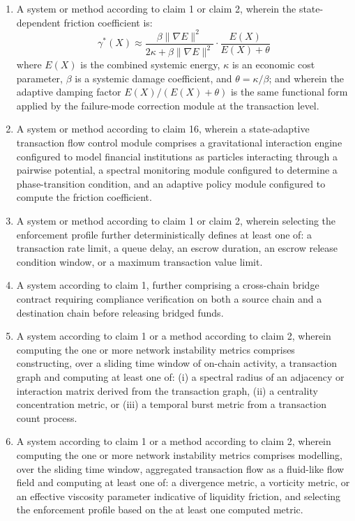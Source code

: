 \documentclass[12pt,a4paper]{article}
\begin{document}
\begin{enumerate}[label=\textbf{\arabic*.}]
\item A system or method according to claim 1 or claim 2, wherein the
state-dependent friction coefficient is:
\[
\gamma^*(X)\approx
\frac{\beta\|\nabla E\|^2}{2\kappa+\beta\|\nabla E\|^2}
\cdot\frac{E(X)}{E(X)+\theta}
\]
where $E(X)$ is the combined systemic energy, $\kappa$ is an economic
cost parameter, $\beta$ is a systemic damage coefficient, and
$\theta=\kappa/\beta$; and wherein the adaptive damping factor
$E(X)/(E(X)+\theta)$ is the same functional form applied by the
failure-mode correction module at the transaction level.

\item A system or method according to claim 16, wherein a state-adaptive
transaction flow control module comprises a gravitational interaction engine
configured to model financial institutions as particles interacting through a
pairwise potential, a spectral monitoring module configured to determine a
phase-transition condition, and an adaptive policy module configured to
compute the friction coefficient.

\item A system or method according to claim 1 or claim 2, wherein selecting
the enforcement profile further deterministically defines at least one of:
a transaction rate limit, a queue delay, an escrow duration, an escrow
release condition window, or a maximum transaction value limit.

\item A system according to claim 1, further comprising a cross-chain
bridge contract requiring compliance verification on both a source chain
and a destination chain before releasing bridged funds.

\item A system according to claim 1 or a method according to claim 2,
wherein computing the one or more network instability metrics comprises
constructing, over a sliding time window of on-chain activity, a
transaction graph and computing at least one of: (i) a spectral radius of an
adjacency or interaction matrix derived from the transaction graph, (ii) a
centrality concentration metric, or (iii) a temporal burst metric from a
transaction count process.

\item A system according to claim 1 or a method according to claim 2,
wherein computing the one or more network instability metrics comprises
modelling, over the sliding time window, aggregated transaction flow as a
fluid-like flow field and computing at least one of: a divergence metric, a
vorticity metric, or an effective viscosity parameter indicative of
liquidity friction, and selecting the enforcement profile based on the at
least one computed metric.


\end{enumerate}
\end{document}
